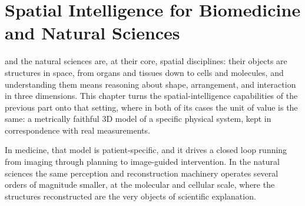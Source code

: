 \chapter{Spatial Intelligence for Biomedicine and Natural Sciences}


 and the natural sciences are, at their core, spatial disciplines: their objects are structures in space, from organs and tissues down to cells and molecules, and understanding them means reasoning about shape, arrangement, and interaction in three dimensions. This chapter turns the spatial-intelligence capabilities of the previous part onto that setting, where in both of its cases the unit of value is the same: a metrically faithful 3D model of a specific physical system, kept in correspondence with real measurements.

In medicine, that model is patient-specific, and it drives a closed loop running from imaging through planning to image-guided intervention. In the natural sciences the same perception and reconstruction machinery operates several orders of magnitude smaller, at the molecular and cellular scale, where the structures reconstructed are the very objects of scientific explanation.



\newpage

